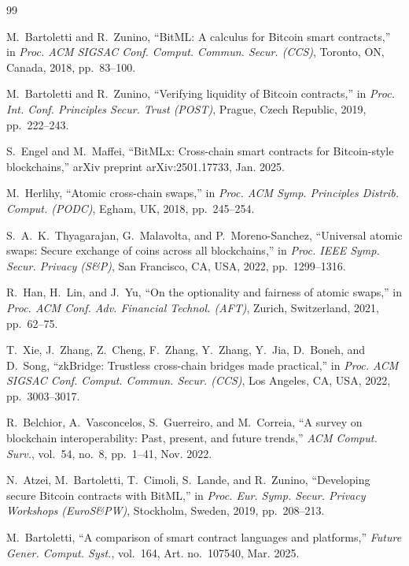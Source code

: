 \documentclass[journal]{IEEEtran}
\begin{document}
\begin{thebibliography}{99}

M.~Bartoletti and R.~Zunino, ``BitML: A calculus for Bitcoin smart contracts,'' in \textit{Proc. ACM SIGSAC Conf. Comput. Commun. Secur. (CCS)}, Toronto, ON, Canada, 2018, pp.~83--100.

M.~Bartoletti and R.~Zunino, ``Verifying liquidity of Bitcoin contracts,'' in \textit{Proc. Int. Conf. Principles Secur. Trust (POST)}, Prague, Czech Republic, 2019, pp.~222--243.

S.~Engel and M.~Maffei, ``BitMLx: Cross-chain smart contracts for Bitcoin-style blockchains,'' arXiv preprint arXiv:2501.17733, Jan. 2025.

M.~Herlihy, ``Atomic cross-chain swaps,'' in \textit{Proc. ACM Symp. Principles Distrib. Comput. (PODC)}, Egham, UK, 2018, pp.~245--254.

S.~A.~K.~Thyagarajan, G.~Malavolta, and P.~Moreno-Sanchez, ``Universal atomic swaps: Secure exchange of coins across all blockchains,'' in \textit{Proc. IEEE Symp. Secur. Privacy (S\&P)}, San Francisco, CA, USA, 2022, pp.~1299--1316.

R.~Han, H.~Lin, and J.~Yu, ``On the optionality and fairness of atomic swaps,'' in \textit{Proc. ACM Conf. Adv. Financial Technol. (AFT)}, Zurich, Switzerland, 2021, pp.~62--75.

T.~Xie, J.~Zhang, Z.~Cheng, F.~Zhang, Y.~Zhang, Y.~Jia, D.~Boneh, and D.~Song, ``zkBridge: Trustless cross-chain bridges made practical,'' in \textit{Proc. ACM SIGSAC Conf. Comput. Commun. Secur. (CCS)}, Los Angeles, CA, USA, 2022, pp.~3003--3017.

R.~Belchior, A.~Vasconcelos, S.~Guerreiro, and M.~Correia, ``A survey on blockchain interoperability: Past, present, and future trends,'' \textit{ACM Comput. Surv.}, vol.~54, no.~8, pp.~1--41, Nov. 2022.

N.~Atzei, M.~Bartoletti, T.~Cimoli, S.~Lande, and R.~Zunino, ``Developing secure Bitcoin contracts with BitML,'' in \textit{Proc. Eur. Symp. Secur. Privacy Workshops (EuroS\&PW)}, Stockholm, Sweden, 2019, pp.~208--213.

M.~Bartoletti, ``A comparison of smart contract languages and platforms,'' \textit{Future Gener. Comput. Syst.}, vol.~164, Art. no.~107540, Mar. 2025.


\end{thebibliography}
\end{document}
